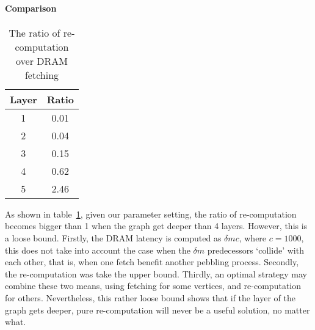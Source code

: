 \documentclass[a4paper, oneside]{article}
\begin{document}
\paragraph{Comparison}
\begin{table}
  \centering
  \begin{tabular}{|c|c|}
     \hline
     Layer & Ratio \\ \hline
     1 & 0.01 \\
     2 & 0.04 \\
     3 & 0.15 \\
     4 & 0.62 \\
     5 & 2.46 \\
     \hline
   \end{tabular}
  \caption{The ratio of re-computation over DRAM fetching}\label{table::recomp-dram-ratio}
\end{table}

As shown in table~\ref{table::recomp-dram-ratio}, given our parameter setting, the ratio of re-computation becomes bigger than 1 when the graph get deeper than 4 layers.
However, this is a loose bound. Firstly, the DRAM latency is computed as $\delta mc$, where $c = 1000$, this does not take into account the case when the $\delta m$
predecessors `collide' with each other, that is, when one fetch benefit another pebbling process. Secondly, the re-computation was take the upper bound. Thirdly, an
optimal strategy may combine these two means, using fetching for some vertices, and re-computation for others. Nevertheless, this rather loose bound shows that if
the layer of the graph gets deeper, pure re-computation will never be a useful solution, no matter what.



\end{document}
